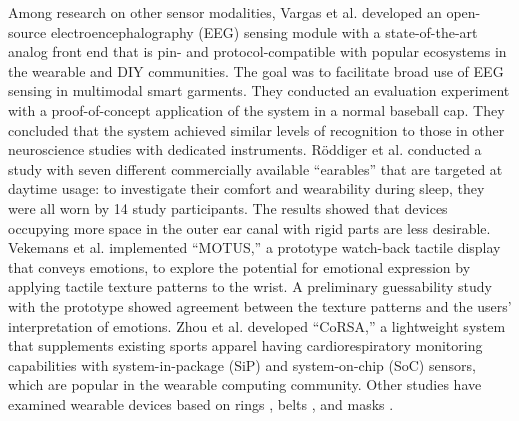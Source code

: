 \documentclass[manuscript,screen,review]{acmart}
\begin{document}
Among research on other sensor modalities, Vargas et al. \cite{Brainwear} developed an open-source electroencephalography (EEG) sensing module with a state-of-the-art analog front end that is pin- and protocol-compatible with popular ecosystems in the wearable and DIY communities. The goal was to facilitate broad use of EEG sensing in multimodal smart garments. They conducted an evaluation experiment with a proof-of-concept application of the system in a normal baseball cap. They concluded that the system achieved similar levels of recognition to those in other neuroscience studies with dedicated instruments. R\"{o}ddiger et al. \cite{earables} conducted a study with seven different commercially available ``earables'' that are targeted at daytime usage: to investigate their comfort and wearability during sleep, they were all worn by 14 study participants. The results showed that devices occupying more space in the outer ear canal with rigid parts are less desirable. Vekemans et al. \cite{MOTUS} implemented ``MOTUS,'' a prototype watch-back tactile display that conveys emotions, to explore the potential for emotional expression by applying tactile texture patterns to the wrist. A preliminary guessability study with the prototype showed agreement between the texture patterns and the users' interpretation of emotions. Zhou et al. \cite{CoRSA} developed ``CoRSA,'' a lightweight system that supplements existing sports apparel having cardiorespiratory monitoring capabilities with system-in-package (SiP) and system-on-chip (SoC) sensors, which are popular in the wearable computing community. Other studies have examined wearable devices based on rings \cite{wearable_ring1, wearable_ring2, TypingRing, ElectroRing}, belts \cite{wearable_belt1, SmartBelt, WaistonBeltX, wearable_belt2}, and masks \cite{wearable_mask1, wearable_mask2, SilentMask, Masquare}.\par
\end{document}

